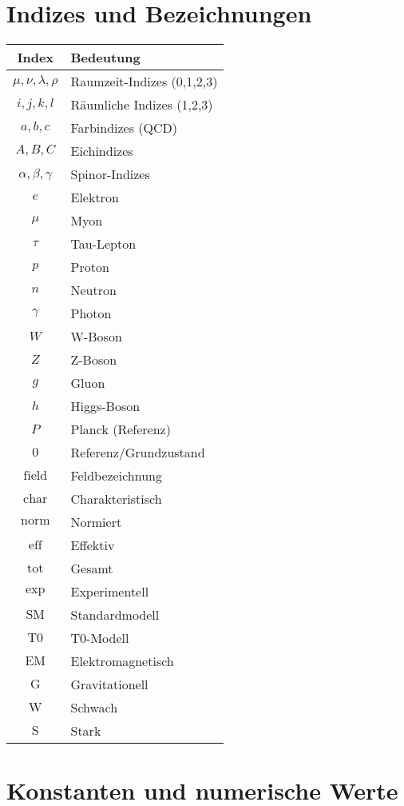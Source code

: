 \documentclass[12pt,a4paper]{report}
\begin{document}
	\section{Indizes und Bezeichnungen}
	\label{sec:indices_designations}
	
	\begin{longtable}{|c|l|}
		\hline
		\textbf{Index} & \textbf{Bedeutung} \\
		\hline
		$\mu, \nu, \lambda, \rho$ & Raumzeit-Indizes (0,1,2,3) \\
		$i, j, k, l$ & Räumliche Indizes (1,2,3) \\
		$a, b, c$ & Farbindizes (QCD) \\
		$A, B, C$ & Eichindizes \\
		$\alpha, \beta, \gamma$ & Spinor-Indizes \\
		$e$ & Elektron \\
		$\mu$ & Myon \\
		$\tau$ & Tau-Lepton \\
		$p$ & Proton \\
		$n$ & Neutron \\
		$\gamma$ & Photon \\
		$W$ & W-Boson \\
		$Z$ & Z-Boson \\
		$g$ & Gluon \\
		$h$ & Higgs-Boson \\
		$P$ & Planck (Referenz) \\
		$0$ & Referenz/Grundzustand \\
		$\text{field}$ & Feldbezeichnung \\
		$\text{char}$ & Charakteristisch \\
		$\text{norm}$ & Normiert \\
		$\text{eff}$ & Effektiv \\
		$\text{tot}$ & Gesamt \\
		$\text{exp}$ & Experimentell \\
		$\text{SM}$ & Standardmodell \\
		$\text{T0}$ & T0-Modell \\
		$\text{EM}$ & Elektromagnetisch \\
		$\text{G}$ & Gravitationell \\
		$\text{W}$ & Schwach \\
		$\text{S}$ & Stark \\
		\hline
	\end{longtable}
	
	\section{Konstanten und numerische Werte}
	\label{sec:constants_values}
	
\end{document}
